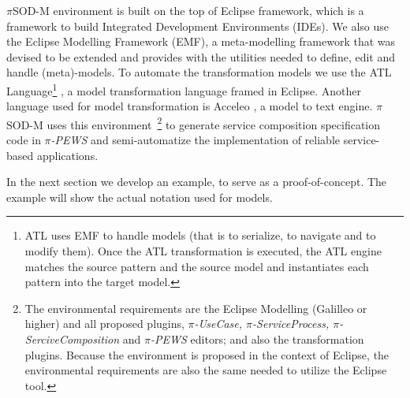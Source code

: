 $\pi$SOD-M environment is built on the top of Eclipse framework, which is a
framework to build Integrated Development Environments (IDEs). We also use the
Eclipse Modelling Framework (EMF), a meta-modelling framework that was devised to be
extended and provides with the utilities needed to define, edit and handle
(meta)-models. To automate the transformation models we use the ATL Language\footnote{ATL uses EMF to handle models (that is to serialize, to navigate and to modify
them). Once the ATL transformation is executed, the ATL engine matches the
source pattern and the source model and instantiates each pattern into the
target model.} \cite{atl_manual}, a model transformation language framed in
Eclipse. Another language used for model transformation is Acceleo \cite{acceleo}, a
model to text engine. $\pi$SOD-M uses this environment~\footnote{The environmental requirements are the Eclipse Modelling (Galilleo or higher)
and all proposed plugins, \textit{$\pi$-UseCase, $\pi$-ServiceProcess,
$\pi$-SerciveComposition} and \textit{$\pi$-PEWS} editors; and also the
transformation plugins. Because the environment is proposed in the
context of Eclipse, the environmental requirements are also the same needed to
utilize the Eclipse tool.} to generate service
composition specification code in \textit{$\pi$-PEWS} and semi-automatize the
 implementation of reliable service-based applications.

In the next section we develop an example, to serve as a proof-of-concept.
The example will show the actual notation used for models. 





